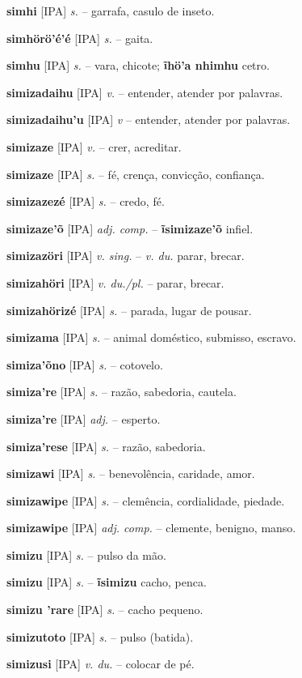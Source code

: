 \textbf{simhi} [IPA] \textit{s.} -- garrafa, casulo de inseto.

\textbf{simhörö'é'é} [IPA] \textit{s.} -- gaita.

\textbf{simhu} [IPA] \textit{s.} -- vara, chicote; \textbf{ĩhö'a nhimhu} cetro.

\textbf{simizadaihu} [IPA] \textit{v.} -- entender, atender por palavras.

\textbf{simizadaihu'u} [IPA] \textit{v} -- entender, atender por palavras.

\textbf{simizaze} [IPA] \textit{v.} -- crer, acreditar.

\textbf{simizaze} [IPA] \textit{s.} -- fé, crença, convicção, confiança.

\textbf{simizazezé} [IPA] \textit{s.} -- credo, fé.

\textbf{simizaze'õ} [IPA] \textit{adj. comp.} -- \textbf{ĩsimizaze'õ} infiel.

\textbf{simizazöri} [IPA] \textit{v. sing.} -- \textit{v. du.} parar, brecar.

\textbf{simizahöri} [IPA] \textit{v. du./pl.} -- parar, brecar.

\textbf{simizahörizé} [IPA] \textit{s.} -- parada, lugar de pousar.

\textbf{simizama} [IPA] \textit{s.} -- animal doméstico, submisso, escravo.

\textbf{simiza'õno} [IPA] \textit{s.} -- cotovelo.

\textbf{simiza're} [IPA] \textit{s.} -- razão, sabedoria, cautela.

\textbf{simiza're} [IPA] \textit{adj.} -- esperto.

\textbf{simiza'rese} [IPA] \textit{s.} -- razão, sabedoria.

\textbf{simizawi} [IPA] \textit{s.} -- benevolência, caridade, amor.

\textbf{simizawipe} [IPA] \textit{s.} -- clemência, cordialidade, piedade.

\textbf{simizawipe} [IPA] \textit{adj. comp.} -- clemente, benigno, manso.

\textbf{simizu} [IPA] \textit{s.} -- pulso da mão.

\textbf{simizu} [IPA] \textit{s.} -- \textbf{ĩsimizu} cacho, penca.

\textbf{simizu 'rare} [IPA] \textit{s.} -- cacho pequeno.

\textbf{simizutoto} [IPA] \textit{s.} -- pulso (batida).

\textbf{simizusi} [IPA] \textit{v. du.} -- colocar de pé.

